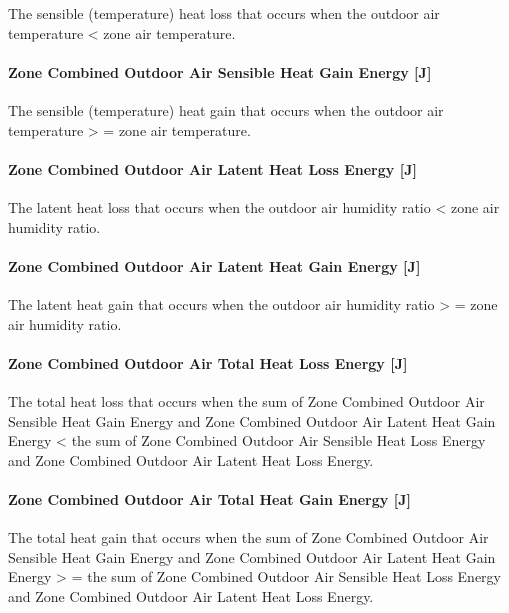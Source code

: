 The sensible (temperature) heat loss that occurs when the outdoor air temperature \textless{} zone air temperature.

\paragraph{Zone Combined Outdoor Air Sensible Heat Gain Energy {[}J{]}}\label{zone-combined-outdoor-air-sensible-heat-gain-energy-j}

The sensible (temperature) heat gain that occurs when the outdoor air temperature \textgreater{} = zone air temperature.

\paragraph{Zone Combined Outdoor Air Latent Heat Loss Energy {[}J{]}}\label{zone-combined-outdoor-air-latent-heat-loss-energy-j}

The latent heat loss that occurs when the outdoor air humidity ratio \textless{} zone air humidity ratio.

\paragraph{Zone Combined Outdoor Air Latent Heat Gain Energy {[}J{]}}\label{zone-combined-outdoor-air-latent-heat-gain-energy-j}

The latent heat gain that occurs when the outdoor air humidity ratio \textgreater{} = zone air humidity ratio.

\paragraph{Zone Combined Outdoor Air Total Heat Loss Energy {[}J{]}}\label{zone-combined-outdoor-air-total-heat-loss-energy-j}

The total heat loss that occurs when the sum of Zone Combined Outdoor Air Sensible Heat Gain Energy and Zone Combined Outdoor Air Latent Heat Gain Energy \textless{} the sum of Zone Combined Outdoor Air Sensible Heat Loss Energy and Zone Combined Outdoor Air Latent Heat Loss Energy.

\paragraph{Zone Combined Outdoor Air Total Heat Gain Energy {[}J{]}}\label{zone-combined-outdoor-air-total-heat-gain-energy-j}

The total heat gain that occurs when the sum of Zone Combined Outdoor Air Sensible Heat Gain Energy and Zone Combined Outdoor Air Latent Heat Gain Energy \textgreater{} = the sum of Zone Combined Outdoor Air Sensible Heat Loss Energy and Zone Combined Outdoor Air Latent Heat Loss Energy.


